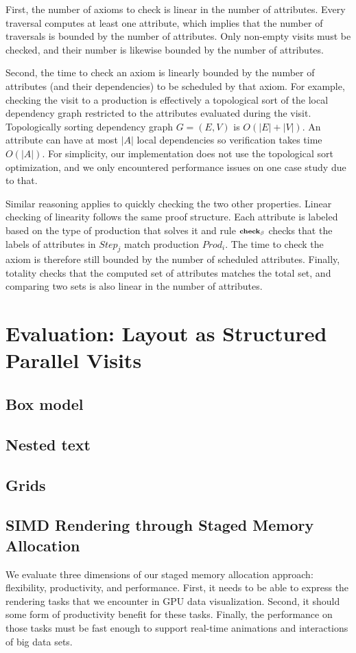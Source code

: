 First, the number of axioms to check is linear in the number of attributes. Every traversal computes at least one attribute, which implies that the number of traversals is bounded by the number of attributes. Only non-empty visits must be checked, and their number is likewise bounded by the number of attributes.

Second, the time to check an axiom is linearly bounded by the number of attributes (and their dependencies) to be scheduled by that axiom. For example, checking the visit to a production is effectively a topological sort of the local dependency graph restricted to the attributes evaluated during the visit. Topologically sorting dependency graph $G = (E, V)$ is $O(|E| + |V|)$. An attribute can have at most $|A|$ local dependencies so verification takes time $O(|A|)$.  For simplicity, our implementation does not use the topological sort optimization, and we only encountered performance issues on one case study due to that.

Similar reasoning applies to quickly checking the two other properties. Linear checking of linearity follows the same proof structure. Each attribute is labeled based on the type of production that solves it and rule ${\scriptstyle\textbf {check}_\beta}$ checks that the labels of attributes in $Step_j$ match production $Prod_i$. The time to check the axiom is therefore still bounded by the number of scheduled attributes. Finally, totality checks that the computed set of attributes matches the total set, and comparing two sets is also linear in the number of attributes.







\section{Evaluation: Layout as Structured Parallel Visits}
\subsection{Box model}
\subsection{Nested text}
\subsection{Grids}


\subsection{SIMD Rendering through Staged Memory Allocation}
We evaluate three dimensions of our staged memory allocation approach: flexibility, productivity, and performance. First, it needs to be able to express the rendering tasks that we encounter in GPU data visualization. Second, it should some form of productivity benefit for these tasks. Finally, the performance on those tasks must be fast  enough to support real-time animations and interactions of big data sets.



